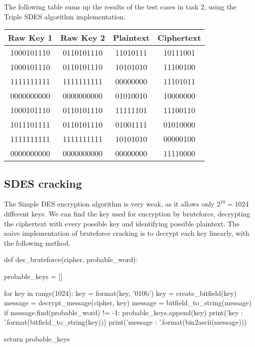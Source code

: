 \documentclass{article}
\begin{document}
The following table sums up the results of the test cases in task 2, using the Triple SDES algorithm implementation.

\begin{center}
    \begin{tabular}{|c c c c|}
        \hline
        \textbf{Raw Key 1} & \textbf{Raw Key 2} & \textbf{Plaintext} & \textbf{Ciphertext} \\
        \hline
        1000101110 & 0110101110 & 11010111 & 10111001 \\
        1000101110 & 0110101110 & 10101010 & 11100100 \\
        1111111111 & 1111111111 & 00000000 & 11101011 \\
        0000000000 & 0000000000 & 01010010 & 10000000 \\
        1000101110 & 0110101110 & 11111101 & 11100110 \\
        1011101111 & 0110101110 & 01001111 & 01010000 \\
        1111111111 & 1111111111 & 10101010 & 00000100 \\
        0000000000 & 0000000000 & 00000000 & 11110000 \\
        \hline
    \end{tabular}
\end{center}

\subsection{SDES cracking}

The Simple DES encryption algorithm is very weak, as it allows only $2^{10} = 1024$ different keys. We can find the key used for encryption by bruteforce, decrypting the ciphertext with every possible key and identifying possible plaintext. The naive implementation of bruteforce cracking is to decrypt each key linearly, with the following method.

\bigskip
\begin{python}
def des_bruteforce(cipher, probable_word):

    probable_keys = []

    for key in range(1024):
        key = format(key, '010b')
        key = create_bitfield(key)
        message = decrypt_message(cipher, key)
        message = bitfield_to_string(message)
        if message.find(probable_word) != -1:
            probable_keys.append(key)
            print('key : {}'.format(bitfield_to_string(key)))
            print('message : {}'.format(bin2ascii(message)))
    
    return probable_keys
\end{python}
\bigskip
\end{document}
